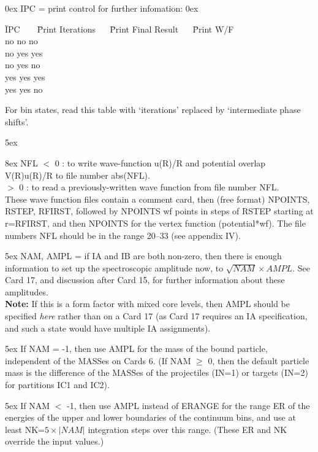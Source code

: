 \documentclass[11pt]{article}
\begin{document}
%
\hangindent 0ex
IPC = print control for further infomation:
%
\hangindent 0ex

\begin{tabbing}
\=IPC ~ ~ \=Print Iterations~ ~ \=Print Final Result ~ ~\=Print W/F\\
  \>no \>no \>no\\
  \>no \>yes \>yes\\
  \>no \>yes \>no\\
  \>yes \>yes \>yes\\
  \>yes \>yes \>no\\
\end{tabbing}

For bin states, read this table with `iterations' replaced by `intermediate
phase shifts'.

\hangindent 5ex

\hangindent 8ex  NFL
      $<$ 0    : to write wave-function u(R)/R and potential overlap
V(R)u(R)/R to file number abs(NFL).
\\  $>$ 0 : to read a previously-written wave function from file number
NFL.
\\ These wave function files contain a comment card,
then (free format) NPOINTS, RSTEP, RFIRST,
followed by NPOINTS wf points in steps of RSTEP starting at r=RFIRST,
and then NPOINTS for the vertex function (potential*wf).
The file numbers NFL should be in the range 20--33 (see appendix IV).



\hangindent 5ex
NAM, AMPL = if IA and IB are both non-zero, then there is enough
information to set up the spectroscopic amplitude now,
to  $\sqrt{NAM} \times AMPL$.
See Card 17, and discussion after Card 15, for further information
about these amplitudes.\\
{\bf Note:} If this is a form factor with mixed core levels,
then AMPL should be specified {\em here} rather than on a Card 17
(as Card 17 requires an IA specification, and such a state would
have multiple IA assignments).

\hangindent 5ex
If NAM = -1, then use AMPL for the mass of the bound particle,
independent of the MASSes on Cards 6.
(If NAM $\geq$ 0, then the default particle mass is the difference of
the MASSes of the projectiles (IN=1) or targets (IN=2) for partitions
IC1 and IC2).

\hangindent 5ex
If NAM $<$ -1, then use AMPL instead of ERANGE for the range ER of the
energies of the upper
and lower boundaries of the continuum bins, and use at least
NK=$5\times|NAM|$ integration steps over this range.
(These ER and NK override the input values.)
\end{document}
